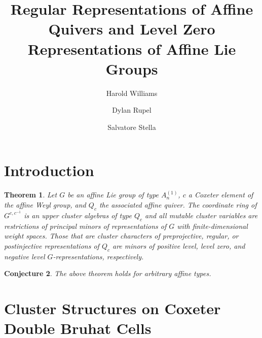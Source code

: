 \documentclass[11pt]{amsart}
\newtheorem{theorem}{Theorem}[section]
\newtheorem{conjecture}[theorem]{Conjecture}
\begin{document}
\title{Regular Representations of Affine Quivers and Level Zero Representations of Affine Lie Groups}

\author{Harold Williams}
\address[Harold Williams]{
University of Texas at Austin\newline
Department of Mathematics\newline
Austin, TX 78712\newline
USA}

\author[Rupel]{Dylan Rupel}
\address[Dylan Rupel]{
University of Notre Dame\newline
Department of Mathematics\newline
Notre Dame, IN 46556\newline
USA}

\author[Stella]{Salvatore Stella}
\address[Salvatore Stella]{Universit\`a degli studi di Roma ``La Sapienza''}

\begin{abstract}
\end{abstract}

\maketitle

\section{Introduction}

\begin{theorem}\label{thm:maintheorem}
Let $G$ be an affine Lie group of type $A_n^{(1)}$, $c$ a Coxeter element of the affine Weyl group, and $Q_c$ the associated affine quiver.  The coordinate ring of $G^{c,c^{-1}}$ is an upper cluster algebras of type $Q_c$ and all mutable cluster variables are restrictions of principal minors of representations of $G$ with finite-dimensional weight spaces.  Those that are cluster characters of preprojective, regular, or postinjective representations of $Q_c$ are minors of positive level, level zero, and negative level $G$-representations, respectively.
\end{theorem}

\begin{conjecture}\label{conj:mainconjecture}
The above theorem holds for arbitrary affine types.
\end{conjecture}

\section{Cluster Structures on Coxeter Double Bruhat Cells}
\end{document}
